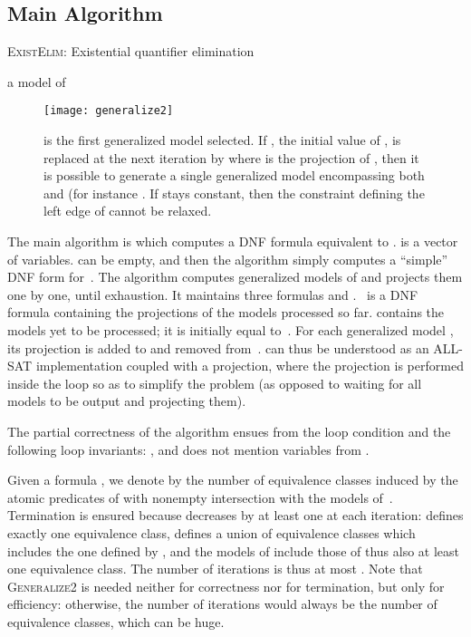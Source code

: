 \subsection{Main Algorithm}
\begin{algorithm}
\caption{\textsc{ExistElim}: Existential quantifier elimination}

\begin{algorithmic}
\STATE 
\STATE 
{}
  \STATE  a model of  \COMMENT{}
  \STATE  \COMMENT{}
  \STATE  \COMMENT{}
  \STATE 
    \COMMENT{}
  \STATE 
  \STATE 
\ENDWHILE
\ENSURE{}
\end{algorithmic}
\end{algorithm}
\begin{figure}
\begin{center}
\texttt{[image: generalize2]}
\end{center}
\caption{ is the first generalized model selected. If , the initial value of , is replaced at the next iteration by  where  is the projection of , then it is possible to generate a single generalized model encompassing both  and  (for instance . If  stays constant, then the  constraint defining the left edge of  cannot be relaxed.}
\label{fig:generalize2}
\end{figure}

The main algorithm is  which computes a DNF formula equivalent to .  is a vector of variables.  can be empty, and then the algorithm simply computes a ``simple'' DNF form for~. The algorithm computes generalized models of  and projects them one by one, until exhaustion. It maintains three formulas  and . ~is a DNF formula containing the projections of the models processed so far.  contains the models yet to be processed; it is initially equal to~. For each generalized model , its projection  is added to  and removed from~.
 can thus be understood as an ALL-SAT implementation coupled with a projection, where the projection is performed inside the loop so as to simplify the problem (as opposed to waiting for all models to be output and projecting them).

The partial correctness of the algorithm ensues from the loop condition and the following loop invariants:
,
 and 
 does not mention variables from .

Given a formula , we denote by  the number of equivalence classes induced by the atomic predicates of  with nonempty intersection with the models of~. Termination is ensured because  decreases by at least one at each iteration:  defines exactly one equivalence class,  defines a union of equivalence classes which includes the one defined by , and the models of  include those of  thus also at least one equivalence class. The number of iterations is thus at most . Note that \textsc{Generalize2} is needed neither for correctness nor for termination, but only for efficiency: otherwise, the number of iterations would always be the number of equivalence classes, which can be huge.

